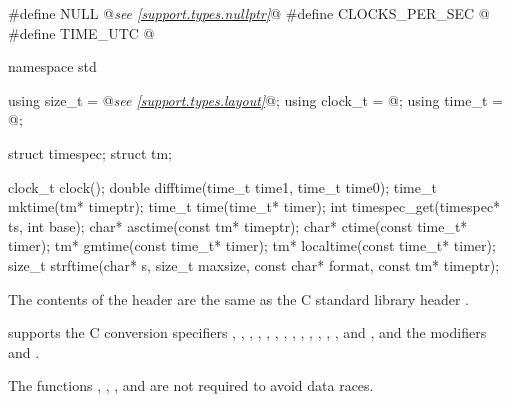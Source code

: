 %
%
%
%
%
%
%
%
%
%
%
%
%
%
%
%
%
%
%
\begin{codeblock}
#define NULL @\textit{see \ref{support.types.nullptr}}@
#define CLOCKS_PER_SEC @\seebelow@
#define TIME_UTC @\seebelow@

namespace std {
  using size_t = @\textit{see \ref{support.types.layout}}@;
  using clock_t = @\seebelow@;
  using time_t = @\seebelow@;

  struct timespec;
  struct tm;

  clock_t clock();
  double difftime(time_t time1, time_t time0);
  time_t mktime(tm* timeptr);
  time_t time(time_t* timer);
  int timespec_get(timespec* ts, int base);
  char* asctime(const tm* timeptr);
  char* ctime(const time_t* timer);
  tm* gmtime(const time_t* timer);
  tm* localtime(const time_t* timer);
  size_t strftime(char* s, size_t maxsize, const char* format, const tm* timeptr);
}
\end{codeblock}

\pnum
The contents of the header  are the same as the C standard library header .
\begin{footnote}
 supports the C conversion specifiers
, , , , , , ,
, , , , , , and
, and the modifiers  and .
\end{footnote}

\pnum
The functions , , , and
 are not required to avoid data
races.


